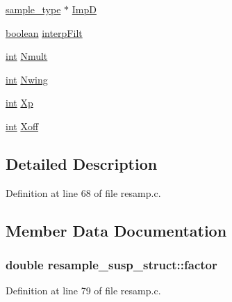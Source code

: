 \begin{DoxyCompactItemize}
\item 
\hyperlink{sound_8h_a3a9d1d4a1c153390d2401a6e9f71b32c}{sample\+\_\+type} $\ast$ \hyperlink{structresample__susp__struct_ab86d9a71cecde838eb4459e285bdbc3a}{ImpD}
\item 
\hyperlink{cext_8h_a7670a4e8a07d9ebb00411948b0bbf86d}{boolean} \hyperlink{structresample__susp__struct_abd525c91b0a3d9d4329e0434362f9a25}{interp\+Filt}
\item 
\hyperlink{xmltok_8h_a5a0d4a5641ce434f1d23533f2b2e6653}{int} \hyperlink{structresample__susp__struct_aa8ff415b23d5937dbbe353fb2e7cbee2}{Nmult}
\item 
\hyperlink{xmltok_8h_a5a0d4a5641ce434f1d23533f2b2e6653}{int} \hyperlink{structresample__susp__struct_a28adb1ecfd7070335354e72d8ea2be84}{Nwing}
\item 
\hyperlink{xmltok_8h_a5a0d4a5641ce434f1d23533f2b2e6653}{int} \hyperlink{structresample__susp__struct_a67c94c5ef406c551d0230a6b95a21c24}{Xp}
\item 
\hyperlink{xmltok_8h_a5a0d4a5641ce434f1d23533f2b2e6653}{int} \hyperlink{structresample__susp__struct_aaa19a541e756553ab84d0d581106496b}{Xoff}
\end{DoxyCompactItemize}


\subsection{Detailed Description}


Definition at line 68 of file resamp.\+c.



\subsection{Member Data Documentation}
\subsubsection[{\texorpdfstring{factor}{factor}}]{\setlength{\rightskip}{0pt plus 5cm}double resample\+\_\+susp\+\_\+struct\+::factor}\hypertarget{structresample__susp__struct_a65c61aa8e789656ca226d1340c1e22ef}{}\label{structresample__susp__struct_a65c61aa8e789656ca226d1340c1e22ef}


Definition at line 79 of file resamp.\+c.

